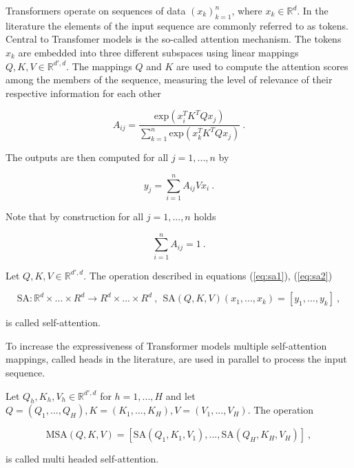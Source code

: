 Transformers operate on sequences of data $(x_{k})_{k=1}^n$, where $x_{k} \in \mathbb R^d$.
In the literature the elements of the input sequence are commonly referred to as tokens.
Central to Transfomer models is the so-called attention mechanism.
The tokens $x_k$ are embedded into three different subspaces using linear mappings $Q, K, V \in \mathbb R^{d', d}$.
The mappings $Q$ and $K$ are used to compute the attention scores among the members of the sequence,
measuring the level of relevance of their respective information for each other

    \begin{equation} \label{eq:sa1}
        A_{ij} = \frac{\text{exp}(x_{i}^T K^T Q x_{j})}{\sum_{k = 1}^n \text{exp}(x_{k}^T K^T Q x_{j})} ~.
    \end{equation}

The outputs are then computed for all $j=1, ..., n$ by 

    \begin{equation} \label{eq:sa2}
        y_{j} = \sum_{i=1}^n A_{ij} V x_{i} ~.
    \end{equation}

Note that by construction for all $j = 1,..., n$ holds

    $$ \sum_{i=1}^n A_{ij} = 1 ~. $$

\begin{definition}
    Let $Q, K, V \in \mathbb R^{d', d}$.
    The operation described in equations (\ref{eq:sa1}), (\ref{eq:sa2}) 

        $$ \text{SA}: \mathbb R^{d} \times ... \times R^{d} \to R^{d} \times ... \times R^{d} ~, ~~ \text{SA} (Q, K, V)(x_1, ..., x_k) = [y_1, ..., y_k] ~, $$

    is called self-attention.
\end{definition}

To increase the expressiveness of Transformer models multiple self-attention mappings, 
called heads in the literature, are used in parallel to process the input sequence.

\begin{definition}
    Let $Q_h, K_h, V_h \in \mathbb R^{d', d}$ for $h= 1,..., H$ and let $Q = (Q_1, ..., Q_H), K = (K_1, ..., K_H), V = (V_1, ..., V_H)$.
    The operation

        $$ \text{MSA}(Q, K, V) = [\text{SA}(Q_1, K_1, V_1), ..., \text{SA}(Q_H, K_H, V_H)] ~, $$

    is called multi headed self-attention.
\end{definition}

